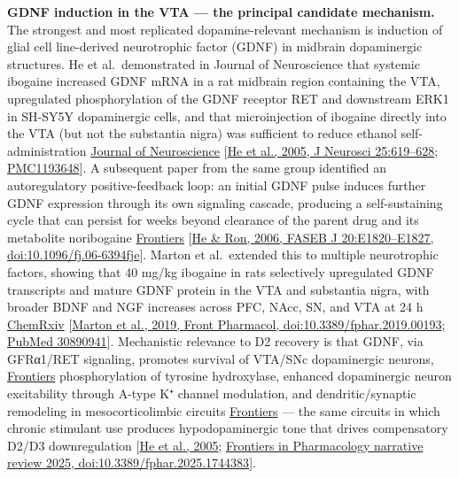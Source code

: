 \textbf{GDNF induction in the VTA --- the principal candidate mechanism.} The strongest and most replicated dopamine-relevant mechanism is induction of glial cell line-derived neurotrophic factor (GDNF) in midbrain dopaminergic structures. He et al.~demonstrated in Journal of Neuroscience that systemic ibogaine increased GDNF mRNA in a rat midbrain region containing the VTA, upregulated phosphorylation of the GDNF receptor RET and downstream ERK1 in SH-SY5Y dopaminergic cells, and that microinjection of ibogaine directly into the VTA (but not the substantia nigra) was sufficient to reduce ethanol self-administration \href{https://www.jneurosci.org/content/25/3/619}{Journal of Neuroscience} {[}\href{https://www.jneurosci.org/content/25/3/619}{He et al., 2005, J Neurosci 25:619--628}; \href{https://www.ncbi.nlm.nih.gov/pmc/articles/PMC1193648/}{PMC1193648}{]}. A subsequent paper from the same group identified an autoregulatory positive-feedback loop: an initial GDNF pulse induces further GDNF expression through its own signaling cascade, producing a self-sustaining cycle that can persist for weeks beyond clearance of the parent drug and its metabolite noribogaine \href{https://www.frontiersin.org/journals/pharmacology/articles/10.3389/fphar.2025.1744383/full}{Frontiers} {[}\href{https://faseb.onlinelibrary.wiley.com/doi/10.1096/fj.06-6394fje}{He \& Ron, 2006, FASEB J 20:E1820--E1827, doi:10.1096/fj.06-6394fje}{]}. Marton et al.~extended this to multiple neurotrophic factors, showing that 40 mg/kg ibogaine in rats selectively upregulated GDNF transcripts and mature GDNF protein in the VTA and substantia nigra, with broader BDNF and NGF increases across PFC, NAcc, SN, and VTA at 24 h \href{https://chemrxiv.org/engage/chemrxiv/article-details/60c73f20337d6c5e99e264df}{ChemRxiv} {[}\href{https://www.frontiersin.org/journals/pharmacology/articles/10.3389/fphar.2019.00193/full}{Marton et al., 2019, Front Pharmacol, doi:10.3389/fphar.2019.00193}; \href{https://pubmed.ncbi.nlm.nih.gov/30890941/}{PubMed 30890941}{]}. Mechanistic relevance to D2 recovery is that GDNF, via GFRα1/RET signaling, promotes survival of VTA/SNc dopaminergic neurons, \href{https://www.frontiersin.org/journals/pharmacology/articles/10.3389/fphar.2025.1744383/full}{Frontiers} phosphorylation of tyrosine hydroxylase, enhanced dopaminergic neuron excitability through A-type K⁺ channel modulation, and dendritic/synaptic remodeling in mesocorticolimbic circuits \href{https://www.frontiersin.org/journals/pharmacology/articles/10.3389/fphar.2025.1744383/full}{Frontiers} --- the same circuits in which chronic stimulant use produces hypodopaminergic tone that drives compensatory D2/D3 downregulation {[}\href{https://www.jneurosci.org/content/25/3/619}{He et al., 2005}; \href{https://www.frontiersin.org/journals/pharmacology/articles/10.3389/fphar.2025.1744383/full}{Frontiers in Pharmacology narrative review 2025, doi:10.3389/fphar.2025.1744383}{]}.

